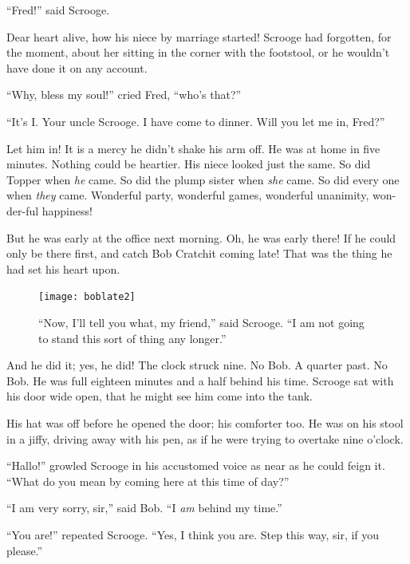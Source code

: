 \documentclass[paper=5.5in:8.5in,BCOR=7mm,twoside,DIV=calc,12pt,usegeometry]{scrbook} %
\begin{document}
\enquote{Fred!} said Scrooge.

Dear heart alive, how his niece by marriage started! Scrooge had forgotten, for the moment, about her sitting in the corner with the footstool, or he wouldn't have done it on any account.

\enquote{Why, bless my soul!} cried Fred, \enquote{who's that?}



\enquote{It's I. Your uncle Scrooge. I have come to dinner. Will you let me in, Fred?}

Let him in! It is a mercy he didn't shake his arm off. He was at home in five minutes. Nothing could be heartier. His niece looked just the same. So did Topper when \textit{he} came. So did the plump sister when \textit{she} came. So did every one when \textit{they} came. Wonderful party, wonderful games, wonderful unanimity, won-der-ful happiness!

But he was early at the office next morning. Oh, he was early there! If he could only be there first, and catch Bob Cratchit coming late! That was the thing he had set his heart upon.

\begin{figure}[p]
\begin{minipage}[c]{\linewidth}
\texttt{[image: boblate2]}
\caption[\enquote{I am not going to stand this sort of thing any longer.}]{\enquote{Now, I'll tell you what, my friend,} said Scrooge. \enquote{I am not going to stand this sort of thing any longer.}}
\end{minipage}
\end{figure}

And he did it; yes, he did! The clock struck nine. No Bob. A quarter past. No Bob. He was full eighteen minutes and a half behind his time. Scrooge sat with his door wide open, that he might see him come into the tank.

His hat was off before he opened the door; his comforter too. He was on his stool in a jiffy, driving away with his pen, as if he were trying to overtake nine o'clock.

\enquote{Hallo!} growled Scrooge in his accustomed voice as near as he could feign it. \enquote{What do you mean by coming here at this time of day?}

\enquote{I am very sorry, sir,} said Bob. \enquote{I \textit{am} behind my time.}

\enquote{You are!} repeated Scrooge. \enquote{Yes, I think you are. Step this way, sir, if you please.}
\end{document}
